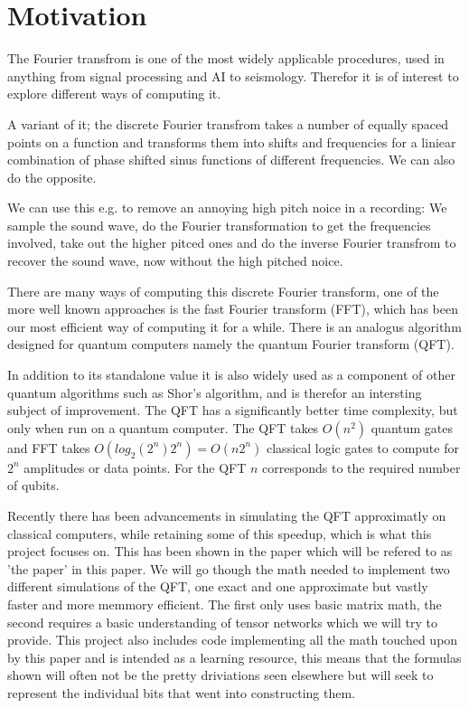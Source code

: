 \section{Motivation}
The Fourier transfrom is one of the most widely applicable procedures, used in anything from signal processing and AI to seismology. Therefor it is of interest to explore different ways of computing it. 

\vspace{\baselineskip}
\noindent
A variant of it; the discrete Fourier transfrom takes a number of equally spaced points on a function 
and transforms them into shifts and frequencies for a liniear combination of phase shifted sinus functions of different frequencies. 
We can also do the opposite. 

We can use this e.g. to remove an annoying high pitch noice in a recording: 
We sample the sound wave, do the Fourier transformation to get the frequencies involved, 
take out the higher pitced ones and do the inverse Fourier transfrom to recover the sound wave, now without the high pitched noice. 



\vspace{\baselineskip}
\noindent
There are many ways of computing this discrete Fourier transform,
one of the more well known approaches is the fast Fourier transform (FFT), which has been our most efficient way of computing it for a while. 
There is an analogus algorithm designed for quantum computers namely the quantum Fourier transform (QFT). 



\vspace{\baselineskip}
\noindent
In addition to its standalone value it is also widely used as a component of other quantum algorithms such as Shor's algorithm, and is therefor an intersting subject of improvement. 
The QFT has a significantly better time complexity, but only when run on a quantum computer. The QFT takes $O(n^2)$ quantum gates and FFT takes $O(log_{2}(2^n) 2^n) = O(n2^n)$\cite{FFT_logic_gates} classical logic gates to compute for $2^n$ amplitudes or data points. For the QFT $n$ corresponds to the required number of qubits. 

Recently there has been advancements in simulating the QFT approximatly on classical computers, while retaining some of this speedup, which is what this project focuses on. This has been shown in the paper\cite{the_paper} which will be refered to as 'the paper' in this paper. We will go though the math needed to implement two different simulations of the QFT, one exact and one approximate but vastly faster and more memmory efficient. The first only uses basic matrix math, the second requires a basic understanding of tensor networks which we will try to provide. This project also includes code implementing all the math touched upon by this paper and is intended as a learning resource, this means that the formulas shown will often not be the pretty driviations seen elsewhere but will seek to represent the individual bits that went into constructing them. 




